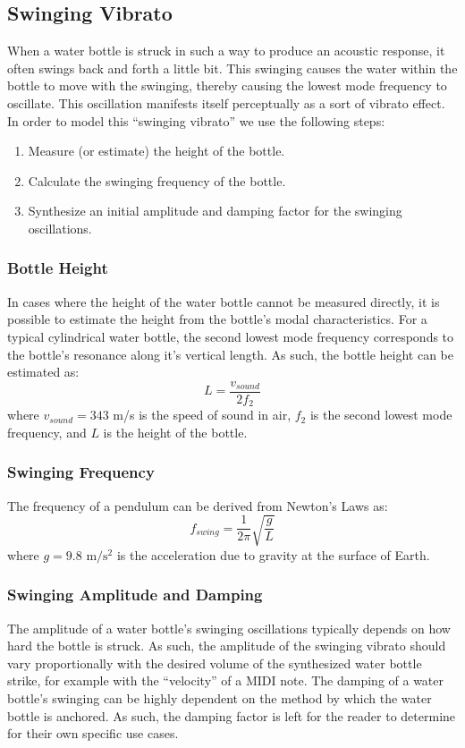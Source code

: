 \documentclass[twoside,a4paper]{article}
\begin{document}
\subsection{Swinging Vibrato} \label{sec:swing}
%
When a water bottle is struck in such a way to produce an acoustic
response, it often swings back and forth a little bit. This swinging
causes the water within the bottle to move with the swinging, thereby
causing the lowest mode frequency to oscillate. This oscillation
manifests itself perceptually as a sort of vibrato effect. In
order to model this ``swinging vibrato'' we use the following
steps:
\begin{enumerate}
    \item Measure (or estimate) the height of the bottle.
    \item Calculate the swinging frequency of the bottle.
    \item Synthesize an initial amplitude and damping factor
        for the swinging oscillations.
\end{enumerate}
%
\subsubsection{Bottle Height}
%
In cases where the height of the water bottle cannot be measured directly,
it is possible to estimate the height from the bottle's modal characteristics.
For a typical cylindrical water bottle, the second lowest mode frequency
corresponds to the bottle's resonance along it's vertical length. As such,
the bottle height can be estimated as:
\begin{equation}
    L = \frac{v_{sound}}{2 f_2}
    \label{eq:bottle-height}
\end{equation}
where $v_{sound} = 343$ m/s is the speed of sound in air, $f_2$ is the second
lowest mode frequency, and $L$ is the height of the bottle.
%
\subsubsection{Swinging Frequency}
%
The frequency of a pendulum can be derived from Newton's Laws as:
\begin{equation}
    f_{swing} = \frac{1}{2\pi} \sqrt{\frac{g}{L}}
    \label{eq:swing-freq}
\end{equation}
where $g = 9.8 \text{ m}/\text{s}^2$ is the acceleration due to gravity at the surface
of Earth.
%
\subsubsection{Swinging Amplitude and Damping}
%
The amplitude of a water bottle's swinging oscillations typically depends
on how hard the bottle is struck. As such, the amplitude of the swinging
vibrato should vary proportionally with the desired volume of the synthesized
water bottle strike, for example with the ``velocity'' of a MIDI note.
The damping of a water bottle's swinging can be highly dependent on the method
by which the water bottle is anchored. As such, the damping factor is left
for the reader to determine for their own specific use cases.
\end{document}
